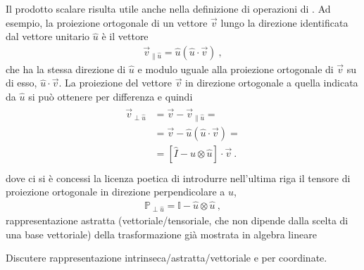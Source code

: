 \documentclass[letterpaper,10pt,italian]{jupyterBook}
\begin{document}
\sphinxAtStartPar
Il prodotto scalare risulta utile anche nella definizione di operazioni di . Ad esempio, la proiezione ortogonale di un vettore \(\vec{v}\) lungo la direzione identificata dal vettore unitario \(\hat{u}\) è il vettore
\begin{equation*}
\begin{split}\vec{v}_{\parallel \hat{u}} = \hat{u} \left( \hat{u} \cdot \vec{v} \right) \ ,\end{split}
\end{equation*}
\sphinxAtStartPar
che ha la stessa direzione di \(\hat{u}\) e modulo uguale alla proiezione ortogonale di \(\vec{v}\) su di esso, \(\hat{u} \cdot \vec{v}\). La proiezione del vettore \(\vec{v}\) in direzione ortogonale a quella indicata da \(\hat{u}\) si può ottenere per differenza e quindi
\begin{equation*}
\begin{split}\begin{aligned}
  \vec{v}_{\perp \hat{u}} 
  & = \vec{v} - \vec{v}_{\parallel \hat{u}} = \\
  & = \vec{v} - \hat{u} \left( \hat{u} \cdot \vec{v} \right) = \\
  & = \left[ \hat{I} - \hat{u} \otimes \hat{u} \right] \cdot \vec{v} \ . \\
\end{aligned}\end{split}
\end{equation*}
\sphinxAtStartPar
dove ci si è concessi la licenza poetica di introdurre nell’ultima riga il tensore di proiezione ortogonale in direzione perpendicolare a \(\hat{u}\),
\begin{equation*}
\begin{split}\mathbb{P}_{\perp \hat{u}} = \mathbb{I} - \hat{u} \otimes \hat{u} \ ,\end{split}
\end{equation*}
\sphinxAtStartPar
rappresentazione astratta (vettoriale/tensoriale, che non dipende dalla scelta di una base vettoriale) della trasformazione già mostrata in algebra lineare  

\sphinxAtStartPar
{} Discutere rappresentazione intrinseca/astratta/vettoriale e per coordinate.
\end{document}
